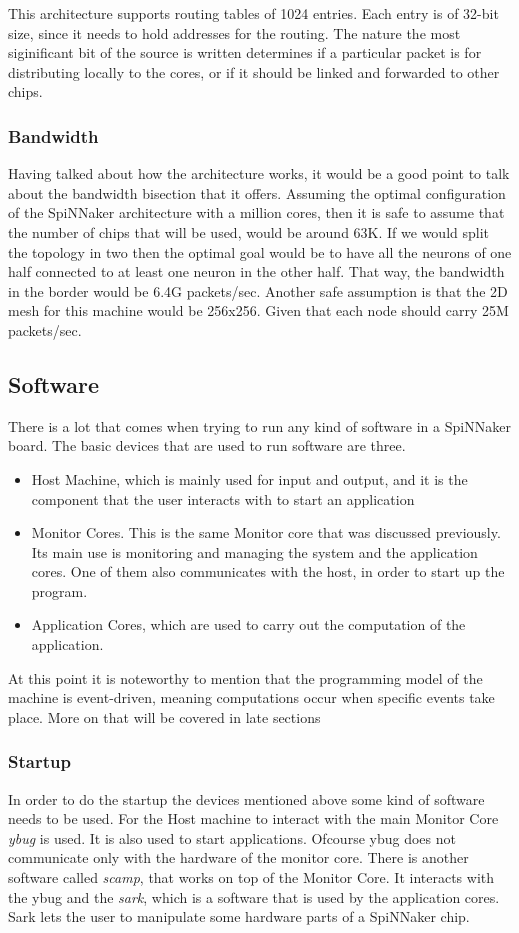 \documentclass[12pt,a4paper]{article}
\begin{document}
This architecture supports routing tables of 1024 entries. Each entry is of 32-bit size, since it needs to hold addresses for the routing. The nature the most siginificant bit of the source is written determines if a particular packet is for distributing locally to the cores, or if it should be linked and forwarded to other chips\cite{docfile}.
\subsubsection{Bandwidth}
Having talked about how the architecture works, it would be a good point to talk about the bandwidth bisection that it offers. Assuming the optimal configuration of the SpiNNaker architecture with a million cores, then it is safe to assume that the number of chips that will be used, would be around 63K. If we would split the topology in two then the optimal goal would be to have all the neurons of one half connected to at least one neuron in the other half. That way, the bandwidth in the border would be 6.4G packets/sec. Another safe assumption is that the 2D mesh for this machine would be 256x256. Given that each node should carry 25M packets/sec\cite{docfile}\cite{navaridas2009understanding}.
\newpage
\subsection{Software}
There is a lot that comes when trying to run any kind of software in a SpiNNaker board. The basic devices that are used to run software are three.
\begin{itemize}
\item Host Machine, which is mainly used for input and output, and it is the component that the user interacts with to start an application
\item Monitor Cores. This is the same Monitor core that was discussed previously. Its main use is monitoring and managing the system and the application cores. One of them also communicates with the host, in order to start up the program.
\item Application Cores, which are used to carry out the computation of the application.\cite{furber2012overview}
\end{itemize}

At this point it is noteworthy to mention that the programming model of the machine is event-driven, meaning computations occur when specific events take place. More on that will be covered in late sections
\subsubsection{Startup}
In order to do the startup the devices mentioned above some kind of software needs to be used. For the Host machine to interact with the main Monitor Core \emph{ybug} is used. It is also used to start applications. Ofcourse ybug does not communicate only with the hardware of the monitor core. There is another software called \emph{scamp}, that works on top of the Monitor Core. It interacts with the ybug and the \emph{sark}, which is a software that is used by the application cores. Sark lets the user to manipulate some hardware parts of a SpiNNaker chip.\cite{spinnweb}
\end{document}
